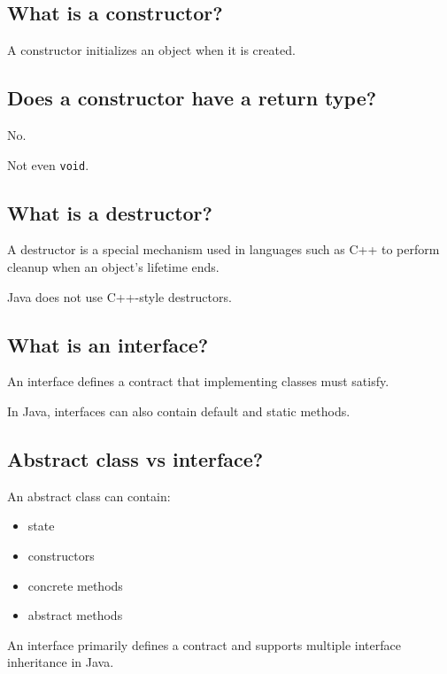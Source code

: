 \medskip

\subsection{What is a constructor?}

A constructor initializes an object when it is created.

\medskip

\subsection{Does a constructor have a return type?}

No.

Not even \texttt{void}.

\medskip

\subsection{What is a destructor?}

A destructor is a special mechanism used in languages such as C++ to perform cleanup when an object's lifetime ends.

Java does not use C++-style destructors.

\medskip

\subsection{What is an interface?}

An interface defines a contract that implementing classes must satisfy.

In Java, interfaces can also contain default and static methods.

\medskip

\subsection{Abstract class vs interface?}

An abstract class can contain:

\begin{itemize}
  \item state
  \item constructors
  \item concrete methods
  \item abstract methods
\end{itemize}

An interface primarily defines a contract and supports multiple interface inheritance in Java.

